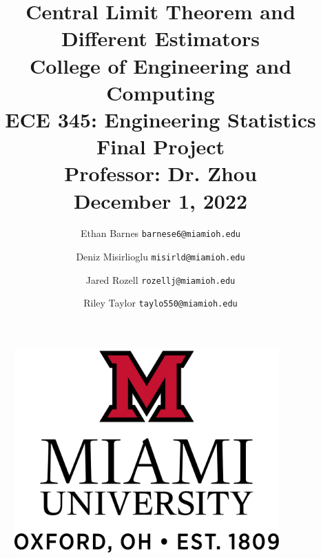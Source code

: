 \documentclass{article}
\begin{document}
\begin{figure}
\vspace*{3cm}
  \hfill\includegraphics[width=4in]{MiamiMcropped.png}\hspace*{\fill}
\end{figure}
\title{%
  \vspace*{.3cm}
  \huge
  Central Limit Theorem and Different Estimators \\
  \vspace*{1cm}
  \large College of Engineering and Computing \\
  \vspace*{.3cm}
	ECE 345: Engineering Statistics Final Project \\
 \vspace*{.3cm}
	Professor: Dr. Zhou \\
 \vspace*{.3cm}
	December 1, 2022
\vspace*{.3cm}}

\author{
Ethan Barnes
\texttt{barnese6@miamioh.edu}
\and
Deniz Misirlioglu
\texttt{misirld@miamioh.edu}
\and
Jared Rozell
\texttt{rozellj@miamioh.edu}
\and
Riley Taylor
\texttt{taylo550@miamioh.edu}
}
\date{}
\maketitle
\newpage
\vspace*{1cm}
\end{document}
